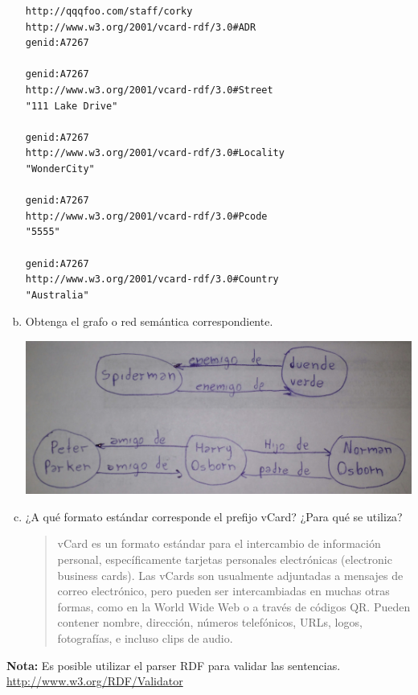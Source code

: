 \documentclass[a4paper,12pt,twoside,final,spanish]{article}
\begin{document}
\begin{enumerate}[a.]
\begin{lstlisting}
http://qqqfoo.com/staff/corky
http://www.w3.org/2001/vcard-rdf/3.0#ADR
genid:A7267

genid:A7267
http://www.w3.org/2001/vcard-rdf/3.0#Street
"111 Lake Drive"

genid:A7267
http://www.w3.org/2001/vcard-rdf/3.0#Locality
"WonderCity"

genid:A7267
http://www.w3.org/2001/vcard-rdf/3.0#Pcode
"5555"

genid:A7267
http://www.w3.org/2001/vcard-rdf/3.0#Country
"Australia"
\end{lstlisting}

\item Obtenga el grafo o red semántica correspondiente.

\dotfill

\begin{center}
\includegraphics[width=0.9\linewidth,keepaspectratio]{4.jpg}
\end{center}

\item ¿A qué formato estándar corresponde el prefijo vCard? ¿Para qué se utiliza?

\dotfill

\begin{quote}
vCard es un formato estándar para el intercambio de información personal, específicamente tarjetas personales electrónicas (electronic business cards). Las vCards son usualmente adjuntadas a mensajes de correo electrónico, pero pueden ser intercambiadas en muchas otras formas, como en la World Wide Web o a través de códigos QR. Pueden contener nombre, dirección, números telefónicos, URLs, logos, fotografías, e incluso clips de audio.
\end{quote}

\end{enumerate}

\textbf{Nota:} Es posible utilizar el parser RDF para validar las sentencias.\\
\url{http://www.w3.org/RDF/Validator}
\end{document}
